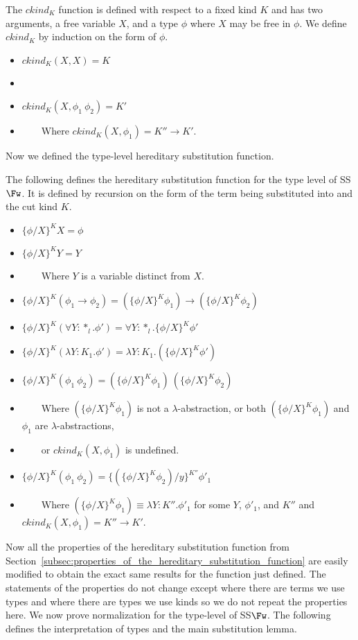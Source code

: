 \begin{definition}
  \label{def:ctype_stlc}
  The $ckind_K$ function is defined with respect to a fixed kind $K$
  and has two arguments, a free variable $X$, and a type $\phi$ where $X$
  may be free in $\phi$.  We define $ckind_K$ by induction on the form of $\phi$.
\begin{itemize}
\item[] $ckind_K(X,X) = K$
  \item[]
  \item[] $ckind_K(X,\phi_1\ \phi_2) = K'$
  \item[] \ \ \ \ Where $ckind_K(X,\phi_1) = K'' \to K'$.
  \end{itemize}
\end{definition}
\noindent
Now we defined the type-level hereditary substitution function.
\begin{definition}
  \label{def:hereditary_substitution_function__type_level_ssfw}
  The following defines the hereditary substitution function for the type level of SS$\Fw$.  It
  is defined by recursion on the form of the term being substituted
  into and the cut kind $K$.
  \begin{itemize}
  \item[] $\{\phi/X\}^K X = \phi$
  \item[] $\{\phi/X\}^K Y = Y$
  \item[] \ \ \ \ Where $Y$ is a variable distinct from $X$.
  \item[] $\{\phi/X\}^K (\phi_1 \to \phi_2) = (\{\phi/X\}^K \phi_1) \to (\{\phi/X\}^K \phi_2)$
  \item[] $\{\phi/X\}^K (\forall Y:*_l.\phi') = \forall Y:*_l.\{\phi/X\}^K \phi'$
  \item[] $\{\phi/X\}^K (\lambda Y:K_1.\phi') = \lambda Y:K_1.(\{\phi / X\}^K \phi')$
  \item[] $\{\phi/X\}^K (\phi_1\ \phi_2) = (\{\phi/X\}^K \phi_1)\ (\{\phi/X\}^K \phi_2)$
  \item[] \ \ \ \ Where $(\{\phi/X\}^K \phi_1)$ is not a $\lambda$-abstraction, or both $(\{\phi/X\}^K \phi_1)$
    and $\phi_1$ are $\lambda$-abstractions,
  \item[] \ \ \ \ or $ckind_K(X,\phi_1)$ is undefined.
  \item[] $\{\phi/X\}^{K} (\phi_1\ \phi_2) = \{(\{\phi/X\}^{K} \phi_2)/y\}^{K''} \phi'_1$
  \item[] \ \ \ \ Where $(\{\phi/X\}^{K} \phi_1) \equiv \lambda Y:K''.\phi'_1$ 
    for some $Y$, $\phi'_1$, and $K''$ and $ckind_K(X,\phi_1) = K'' \to K'$.
  \end{itemize}
\end{definition}
Now all the properties of the hereditary substitution function from
Section~\ref{subsec:properties_of_the_hereditary_substitution_function}
are easily modified to obtain the exact same results for the function
just defined.  The statements of the properties do not change except
where there are terms we use types and where there are types we use
kinds so we do not repeat the properties here.  We now prove
normalization for the type-level of SS$\Fw$.  The following defines
the interpretation of types and the main substitution lemma.

